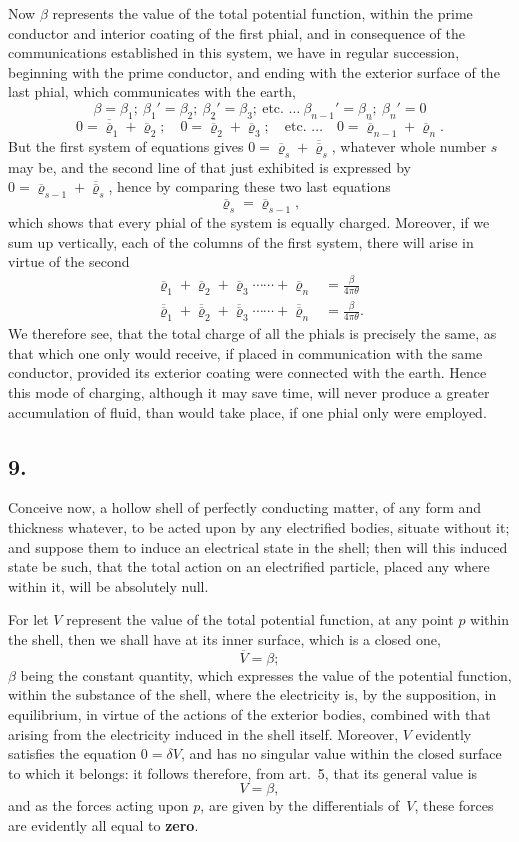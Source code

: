 \documentclass[11pt,notitlepage]{amsart}
\let\Emphasis\textbf
\newcommand\Section[1]{\subsection{{#1}}}
\renewcommand{\rho}{\varrho}
\begin{document}
Now $\beta$ represents the value of the total potential function, within the
prime conductor and interior coating of the first phial, and in consequence of
the communications established in this system, we have in regular succession,
beginning with the prime conductor, and ending with the exterior surface of
the last phial, which communicates with the earth,
\[
\beta=\beta_1;
\ \beta_1'=\beta_2;
\ \beta_2'=\beta_3;
\ \text{etc.\ \ldots}
\ \beta_{n-1}'=\beta_n;
\ \beta_n'=0
\]
\[
0=\overline{\overline\rho}_1+\overline\rho_2;
\quad 0=\overline{\overline\rho}_2+\overline\rho_3;
\quad\text{etc.\ \ldots}
\quad 0=\overline{\overline\rho}_{n-1}+\overline\rho_n.
\]
But the first system of equations gives
$0=\overline\rho_s+\overline{\overline\rho}_s$,
whatever whole number $s$
may be, and the second line of that just exhibited is expressed by
$0=\overline\rho_{s-1}+\overline{\overline\rho}_s$,
hence by comparing these two last equations
\[
\overline\rho_s=\overline\rho_{s-1},
\]
which shows that every phial of the system is equally charged. Moreover,
if we sum up vertically, each of the columns of the first system, there will
arise in virtue of the second
\[
\begin{aligned}
\overline\rho_1+\overline\rho_2+\overline\rho_3\cdots\cdots
+\overline\rho_n
&=\frac{\beta}{4\pi\theta}\\
\overline{\overline\rho}_1+\overline{\overline\rho}_2
+\overline{\overline\rho}_3\cdots\cdots
+\overline{\overline\rho}_n
&=\frac{\beta}{4\pi\theta}.
\end{aligned}
\]
We therefore see, that the total charge of all the phials is precisely
the same, as that which one only would receive, if placed in communication
with the same conductor, provided its exterior coating were connected with
the earth. Hence this mode of charging, although it may save time, will
never produce a greater accumulation of fluid, than would take place, if one
phial only were employed.
\bigskip

\Section{9.}
Conceive now, a hollow shell of perfectly conducting matter, of any
form and thickness whatever, to be acted upon by any electrified bodies,
situate without it; and suppose them to induce an electrical state in the shell;
then will this induced state be such, that the total action on an electrified
particle, placed any where within it, will be absolutely null.

For let $V$ represent the value of the total potential function, at any
point $p$ within the shell, then we shall have at its inner surface, which is a
closed one,
\[
\overline{V}=\beta;
\]
$\beta$ being the constant quantity, which expresses the value of the potential
function, within the substance of the shell, where the electricity is, by the
supposition, in equilibrium, in virtue of the actions of the exterior bodies,
combined with that arising from the electricity induced in the shell itself.
Moreover, $V$ evidently satisfies the equation $0=\delta V$,
and has no singular
value within the closed surface to which it belongs: it follows therefore, from
art.~5, that its general value is
\[
V=\beta,
\]
and as the forces acting upon $p$, are given by the differentials of~$V$, these
forces are evidently all equal to \Emphasis{zero}.
\end{document}
